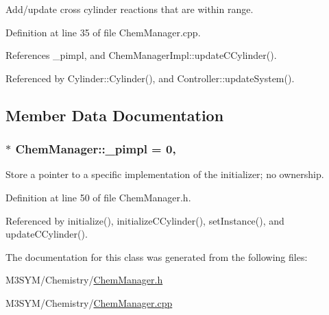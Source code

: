 Add/update cross cylinder reactions that are within range. 



Definition at line 35 of file Chem\+Manager.\+cpp.



References \+\_\+pimpl, and Chem\+Manager\+Impl\+::update\+C\+Cylinder().



Referenced by Cylinder\+::\+Cylinder(), and Controller\+::update\+System().



\subsection{Member Data Documentation}
\hypertarget{classChemManager_aa8fe0dad2d7ed00b8fd05e3ae6a2dd4a}{
\subsubsection[{\+\_\+pimpl}]{ $\ast$ Chem\+Manager\+::\+\_\+pimpl = 0\hspace{0.3cm}{\ttfamily [static]}, {\ttfamily [private]}}}\label{classChemManager_aa8fe0dad2d7ed00b8fd05e3ae6a2dd4a}


Store a pointer to a specific implementation of the initializer; no ownership. 



Definition at line 50 of file Chem\+Manager.\+h.



Referenced by initialize(), initialize\+C\+Cylinder(), set\+Instance(), and update\+C\+Cylinder().



The documentation for this class was generated from the following files\+:\begin{DoxyCompactItemize}
\item 
M3\+S\+Y\+M/\+Chemistry/\hyperlink{ChemManager_8h}{Chem\+Manager.\+h}\item 
M3\+S\+Y\+M/\+Chemistry/\hyperlink{ChemManager_8cpp}{Chem\+Manager.\+cpp}\end{DoxyCompactItemize}
